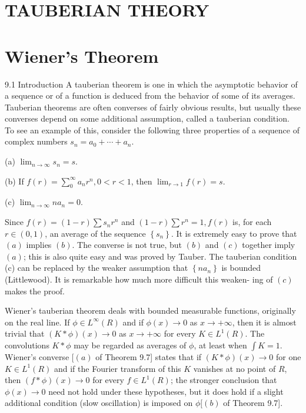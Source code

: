 \documentclass[10pt]{article}
\begin{document}
\section{TAUBERIAN THEORY}
\section{Wiener's Theorem}
9.1 Introduction A tauberian theorem is one in which the asymptotic behavior of a sequence or of a function is deduced from the behavior of some of its averages. Tauberian theorems are often converses of fairly obvious results, but usually these converses depend on some additional assumption, called a tauberian condition. To see an example of this, consider the following three properties of a sequence of complex numbers $s_{n}=a_{0}+\cdots+a_{n}$.

(a) $\lim _{n \rightarrow \infty} s_{n}=s$.

(b) If $f(r)=\sum_{0}^{\infty} a_{n} r^{n}, 0<r<1$, then $\lim _{r \rightarrow 1} f(r)=s$.

(c) $\lim _{n \rightarrow \infty} n a_{n}=0$.

Since $f(r)=(1-r) \sum s_{n} r^{n}$ and $(1-r) \sum r^{n}=1, f(r)$ is, for each $r \in(0,1)$, an average of the sequence $\left\{s_{n}\right\}$. It is extremely easy to prove that $(a)$ implies $(b)$. The converse is not true, but $(b)$ and $(c)$ together imply $(a)$; this is also quite easy and was proved by Tauber. The tauberian condition (c) can be replaced by the weaker assumption that
$\left\{n a_{n}\right\}$ is bounded (Littlewood). It is remarkable how much more difficult this weaken-
ing of $(c)$ makes the proof.

Wiener's tauberian theorem deals with bounded measurable functions, originally on the real line. If $\phi \in L^{\infty}(R)$ and if $\phi(x) \rightarrow 0$ as $x \rightarrow+\infty$, then it is almost trivial that $(K * \phi)(x) \rightarrow 0$ as $x \rightarrow+\infty$ for every $K \in L^{1}(R)$. The convolutions $K * \phi$ may be regarded as averages of $\phi$, at least when $\int K=1$. Wiener's converse $[(a)$ of Theorem 9.7] states that if $(K * \phi)(x) \rightarrow 0$ for one $K \in L^{1}(R)$ and if the Fourier transform of this $K$ vanishes at no point of $R$, then $(f * \phi)(x) \rightarrow 0$ for every $f \in L^{1}(R)$; the stronger conclusion that $\phi(x) \rightarrow 0$ need not hold under these hypotheses, but it does hold if a slight additional condition (slow oscillation) is imposed on $\phi[(b)$ of Theorem 9.7].
\end{document}
